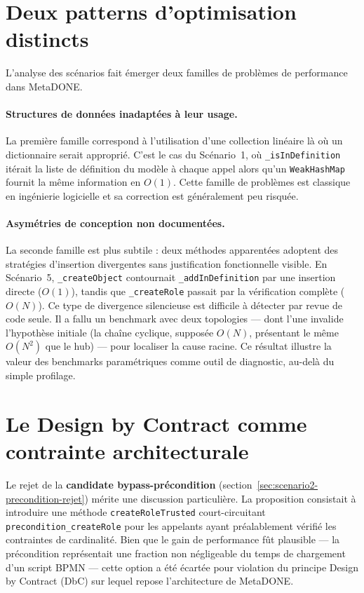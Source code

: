 \section{Deux patterns d'optimisation distincts}

L'analyse des scénarios fait émerger deux familles de problèmes de performance dans MetaDONE.

\paragraph{Structures de données inadaptées à leur usage.}
La première famille correspond à l'utilisation d'une collection linéaire là où un dictionnaire serait approprié. C'est le cas du Scénario~1, où \texttt{\_isInDefinition} itérait la liste de définition du modèle à chaque appel alors qu'un \texttt{WeakHashMap} fournit la même information en $O(1)$. Cette famille de problèmes est classique en ingénierie logicielle et sa correction est généralement peu risquée.

\paragraph{Asymétries de conception non documentées.}
La seconde famille est plus subtile : deux méthodes apparentées adoptent des stratégies d'insertion divergentes sans justification fonctionnelle visible. En Scénario~5, \texttt{\_createObject} contournait \texttt{\_addInDefinition} par une insertion directe ($O(1)$), tandis que \texttt{\_createRole} passait par la vérification complète ($O(N)$). Ce type de divergence silencieuse est difficile à détecter par revue de code seule. Il a fallu un benchmark avec deux topologies — dont l'une invalide l'hypothèse initiale (la chaîne cyclique, supposée $O(N)$, présentant le même $O(N^2)$ que le hub) — pour localiser la cause racine. Ce résultat illustre la valeur des benchmarks paramétriques comme outil de diagnostic, au-delà du simple profilage.

\section{Le Design by Contract comme contrainte architecturale}

Le rejet de la \textbf{candidate bypass-précondition} (section~\ref{sec:scenario2-precondition-rejet}) mérite une discussion particulière. La proposition consistait à introduire une méthode \texttt{createRoleTrusted} court-circuitant \texttt{precondition\_createRole} pour les appelants ayant préalablement vérifié les contraintes de cardinalité. Bien que le gain de performance fût plausible --- la précondition représentait une fraction non négligeable du temps de chargement d'un script BPMN --- cette option a été écartée pour violation du principe Design by Contract (DbC) sur lequel repose l'architecture de MetaDONE.

